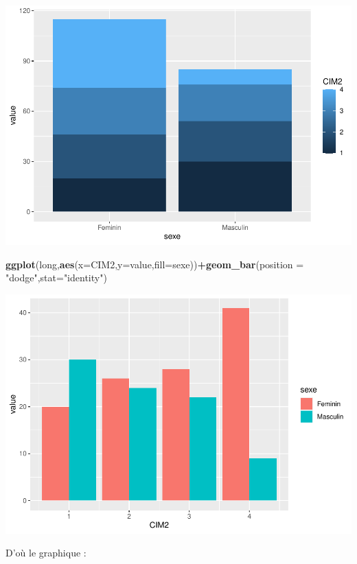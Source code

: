 \documentclass[
]{book}
\newenvironment{Shaded}{\begin{snugshade}}{\end{snugshade}}
\newcommand{\AttributeTok}[1]{\textcolor[rgb]{0.13,0.29,0.53}{#1}}
\newcommand{\FunctionTok}[1]{\textcolor[rgb]{0.13,0.29,0.53}{\textbf{#1}}}
\newcommand{\NormalTok}[1]{#1}
\newcommand{\SpecialCharTok}[1]{\textcolor[rgb]{0.81,0.36,0.00}{\textbf{#1}}}
\newcommand{\StringTok}[1]{\textcolor[rgb]{0.31,0.60,0.02}{#1}}
\begin{document}
\includegraphics{_main_files/figure-latex/ggplot30-1.pdf}

\begin{Shaded}
\begin{Highlighting}[]
\FunctionTok{ggplot}\NormalTok{(long,}\FunctionTok{aes}\NormalTok{(}\AttributeTok{x=}\NormalTok{CIM2,}\AttributeTok{y=}\NormalTok{value,}\AttributeTok{fill=}\NormalTok{sexe))}\SpecialCharTok{+}\FunctionTok{geom\_bar}\NormalTok{(}\AttributeTok{position =} \StringTok{"dodge"}\NormalTok{,}\AttributeTok{stat=}\StringTok{"identity"}\NormalTok{)}
\end{Highlighting}
\end{Shaded}

\includegraphics{_main_files/figure-latex/ggplot31-1.pdf}

D'où le graphique :
\end{document}
